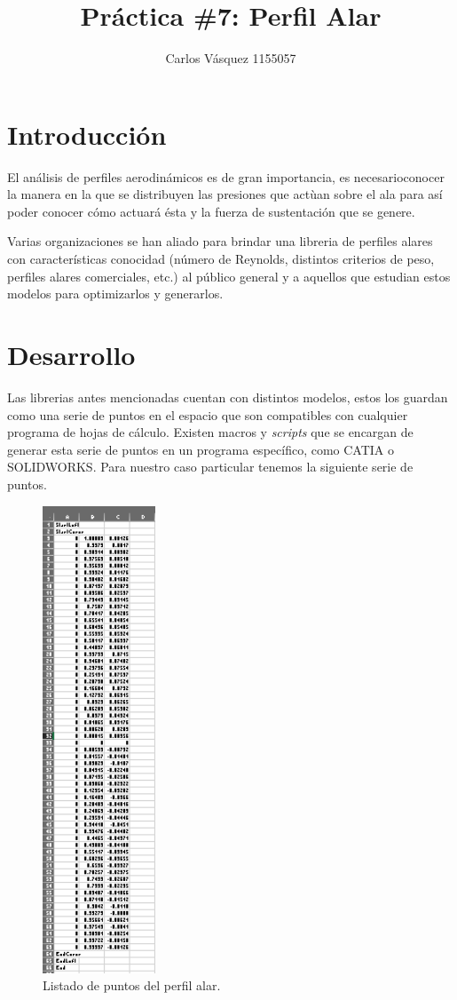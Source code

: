 \documentclass[12pt, letterpaper]{article}
\title{Práctica \#7: Perfil Alar}
\author{Carlos Vásquez 1155057}
\begin{document}
\maketitle
\section*{Introducción}
El análisis de perfiles aerodinámicos es de gran importancia, es necesarioconocer la manera en la que se distribuyen las presiones que actùan sobre el ala para así poder conocer cómo actuará ésta y la fuerza de sustentación que se genere.

Varias organizaciones se han aliado para brindar una libreria de perfiles alares con características conocidad (número de Reynolds, distintos criterios de peso, perfiles alares comerciales, etc.) al público general y a aquellos que estudian estos modelos para optimizarlos y generarlos.

\section*{Desarrollo}
Las librerias antes mencionadas cuentan con distintos modelos, estos los guardan como una serie de puntos en el espacio que son compatibles con cualquier programa de hojas de cálculo. Existen macros y \textit{scripts} que se encargan de generar esta serie de puntos en un programa específico, como CATIA o SOLIDWORKS. Para nuestro caso particular tenemos la siguiente serie de puntos.

\begin{figure}[H]
	\centering
	\includegraphics[width=0.3\textwidth]{points.png}
	\caption{Listado de puntos del perfil alar.}
\end{figure}
\end{document}
